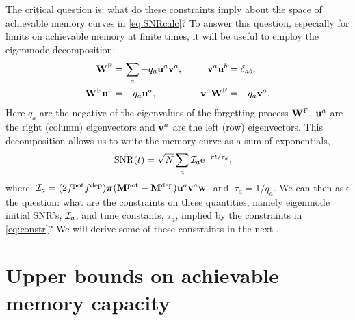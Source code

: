 The critical question is: what do these constraints imply about the space of achievable memory curves in \cref{eq:SNRcalc}?
To answer this question, especially for limits on achievable memory at finite times, it will be useful to employ the eigenmode decomposition:
%
\begin{equation}\label{eq:eigendecomp}
\begin{aligned}
  \frg &= \sum_a -q_a \uv^a \vv^a,
  &\quad
  \vv^a \uv^b &= \delta_{ab},
  \\%
  \frg \uv^a &= -q_a \uv^a,
  &\quad
  \vv^a \frg &= -q_a \vv^a.
\end{aligned}
\end{equation}
%
Here $q_a$ are the negative of the eigenvalues of the forgetting process $\mathbf{W}^{\mathrm{F}}$, $\mathbf{u}^a$ are the right (column) eigenvectors and $\mathbf{v}^a$ are the left (row) eigenvectors.
This decomposition allows us to write the memory curve as a sum of exponentials,
%
\begin{equation}\label{eq:SNReigen}
\begin{aligned}
  \operatorname{SNR}(t) &= \sqrt{N}\sum_a \mathcal{I}_a \mathrm{e}^{-rt/\tau_a},
\end{aligned}
\end{equation}
%
where $\;\mathcal{I}_a = (2 f^{\text{pot}} f^{\text{dep}}) \boldsymbol{\pi} (\mathbf{M}^{\text{pot}}-\mathbf{M}^{\text{dep}}) \mathbf{u}^a  \mathbf{v}^a \mathbf{w}\;$ and $\;\tau_a = {1}/{q_a}$.
We can then ask the question: what are the constraints on these quantities, namely eigenmode initial SNR's, $\mathcal{I}_a$, and time constants, $\tau_a$, implied by the constraints in \cref{eq:constr}?
We will derive some of these constraints in the next .

\section{Upper bounds on achievable memory capacity}\label{sec:bounds}

